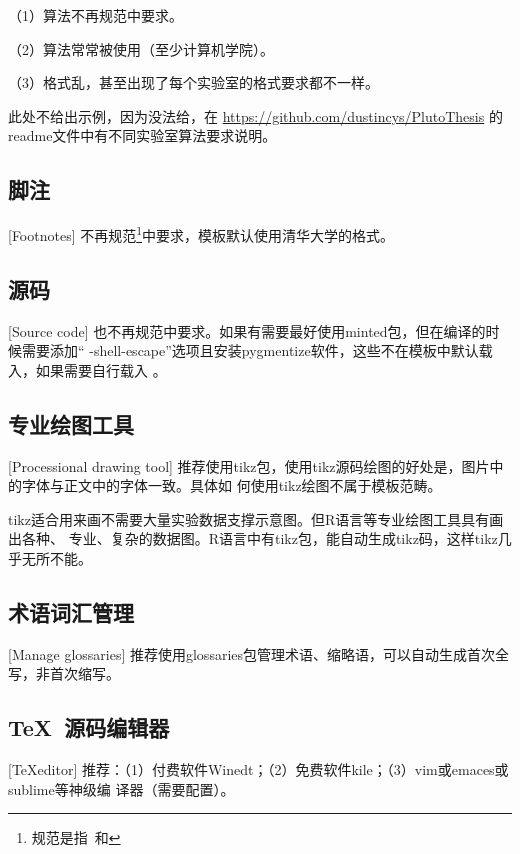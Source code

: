 （1）算法不再规范中要求。

（2）算法常常被使用（至少计算机学院）。

（3）格式乱，甚至出现了每个实验室的格式要求都不一样。

此处不给出示例，因为没法给，在
\href{https://github.com/dustincys/PlutoThesis}{https://github.com/dustincys/PlutoThesis}
的readme文件中有不同实验室算法要求说明。

\subsection{脚注}[Footnotes]
不再规范\footnote{规范是指\PGR\ 和\UGR}中要求，模板默认使用清华大学的格式。

\subsection{源码}[Source code]
也不再规范中要求。如果有需要最好使用minted包，但在编译的时候需要添加“
-shell-escape”选项且安装pygmentize软件，这些不在模板中默认载入，如果需要自行载入
。

\subsection{专业绘图工具}[Processional drawing tool]
推荐使用tikz包，使用tikz源码绘图的好处是，图片中的字体与正文中的字体一致。具体如
何使用tikz绘图不属于模板范畴。

tikz适合用来画不需要大量实验数据支撑示意图。但R语言等专业绘图工具具有画出各种、
专业、复杂的数据图。R语言中有tikz包，能自动生成tikz码，这样tikz几乎无所不能。

\subsection{术语词汇管理}[Manage glossaries]
推荐使用glossaries包管理术语、缩略语，可以自动生成首次全写，非首次缩写。

\subsection{\TeX\ 源码编辑器}[\TeX editor]
推荐：（1）付费软件Winedt；（2）免费软件kile；（3）vim或emaces或sublime等神级编
译器（需要配置）。


